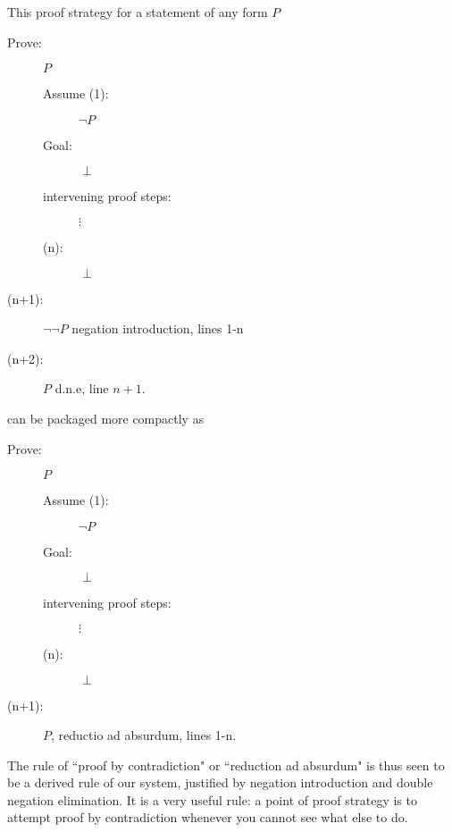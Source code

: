 \documentclass[12pt]{article}
\begin{document}
This proof strategy for a statement of any form $P$

\begin{description}

\item[Prove:]  $P$

\begin{description}

\item[Assume (1):]  $\neg P$

\item[Goal:]  $\perp$

\item[intervening proof steps:]  $\vdots$

\item[(n):]  $\perp$



\end{description}

\item[(n+1):]  $\neg \neg P$ negation introduction, lines 1-n

\item[(n+2):]   $P$ d.n.e, line $n+1$.


\end{description}

can be packaged more compactly as 


\begin{description}

\item[Prove:]  $P$

\begin{description}

\item[Assume (1):]  $\neg P$

\item[Goal:]  $\perp$

\item[intervening proof steps:]  $\vdots$

\item[(n):]  $\perp$



\end{description}

\item[(n+1):]  $P$, reductio ad absurdum, lines 1-n.


\end{description}

The rule of ``proof by contradiction" or ``reduction ad absurdum" is thus seen to be a derived rule of our system, justified by negation introduction and double negation elimination.  It is a very useful rule:  a point of proof strategy is to attempt proof by contradiction whenever you cannot see what else to do.
\end{document}
